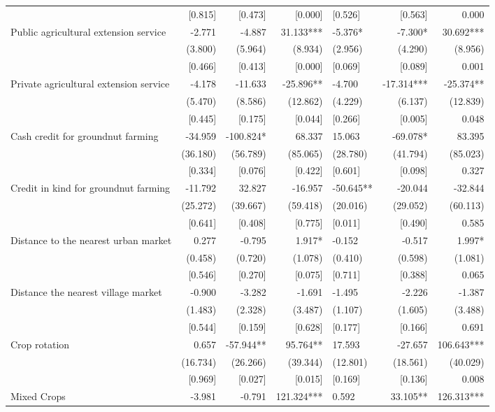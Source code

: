 \documentclass[
]{article}
\begin{document}
\begin{landscape}
\begin{ThreePartTable}
\begin{longtable}[t]{lrrrlrr}
 & {}[0.815] & {}[0.473] & {}[0.000] & {}[0.526] & {}[0.563] & 0.000\\
Public agricultural extension service & -2.771 & -4.887 & 31.133*** & -5.376* & -7.300* & 30.692***\\
 & (3.800) & (5.964) & (8.934) & (2.956) & (4.290) & (8.956)\\
 & {}[0.466] & {}[0.413] & {}[0.000] & {}[0.069] & {}[0.089] & 0.001\\
Private agricultural extension service & -4.178 & -11.633 & -25.896** & -4.700 & -17.314*** & -25.374**\\
 & (5.470) & (8.586) & (12.862) & (4.229) & (6.137) & (12.839)\\
 & {}[0.445] & {}[0.175] & {}[0.044] & {}[0.266] & {}[0.005] & 0.048\\
Cash credit for groundnut farming & -34.959 & -100.824* & 68.337 & 15.063 & -69.078* & 83.395\\
 & (36.180) & (56.789) & (85.065) & (28.780) & (41.794) & (85.023)\\
 & {}[0.334] & {}[0.076] & {}[0.422] & {}[0.601] & {}[0.098] & 0.327\\
Credit in kind for groundnut farming & -11.792 & 32.827 & -16.957 & -50.645** & -20.044 & -32.844\\
 & (25.272) & (39.667) & (59.418) & (20.016) & (29.052) & (60.113)\\
 & {}[0.641] & {}[0.408] & {}[0.775] & {}[0.011] & {}[0.490] & 0.585\\
Distance to the nearest urban market & 0.277 & -0.795 & 1.917* & -0.152 & -0.517 & 1.997*\\
 & (0.458) & (0.720) & (1.078) & (0.410) & (0.598) & (1.081)\\
 & {}[0.546] & {}[0.270] & {}[0.075] & {}[0.711] & {}[0.388] & 0.065\\
Distance the nearest village market & -0.900 & -3.282 & -1.691 & -1.495 & -2.226 & -1.387\\
 & (1.483) & (2.328) & (3.487) & (1.107) & (1.605) & (3.488)\\
 & {}[0.544] & {}[0.159] & {}[0.628] & {}[0.177] & {}[0.166] & 0.691\\
Crop rotation & 0.657 & -57.944** & 95.764** & 17.593 & -27.657 & 106.643***\\
 & (16.734) & (26.266) & (39.344) & (12.801) & (18.561) & (40.029)\\
 & {}[0.969] & {}[0.027] & {}[0.015] & {}[0.169] & {}[0.136] & 0.008\\
Mixed Crops & -3.981 & -0.791 & 121.324*** & 0.592 & 33.105** & 126.313***\\

\end{longtable}
\end{ThreePartTable}
\end{landscape}
\end{document}
